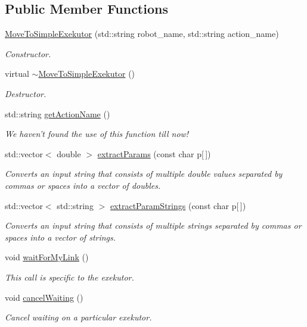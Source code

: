 \subsection*{\-Public \-Member \-Functions}
\begin{DoxyCompactItemize}
\item 
\hyperlink{classexekutor_1_1MoveToSimpleExekutor_ac5a9f74e210eccfb6ecf42e07c00165d}{\-Move\-To\-Simple\-Exekutor} (std\-::string robot\-\_\-name, std\-::string action\-\_\-name)
\begin{DoxyCompactList}\small\item\em \-Constructor. \end{DoxyCompactList}\item 
virtual \hyperlink{classexekutor_1_1MoveToSimpleExekutor_a12574720abc2e2ea378610b7a7876c61}{$\sim$\-Move\-To\-Simple\-Exekutor} ()
\begin{DoxyCompactList}\small\item\em \-Destructor. \end{DoxyCompactList}\item 
std\-::string \hyperlink{classexekutor_1_1ActionExekutor_a48d170d3931798f4019856fc0f070392}{get\-Action\-Name} ()
\begin{DoxyCompactList}\small\item\em \-We haven't found the use of this function till now! \end{DoxyCompactList}\item 
std\-::vector$<$ double $>$ \hyperlink{classexekutor_1_1ActionExekutor_a4b392ae5a75627136a0c69832628ff28}{extract\-Params} (const char p\mbox{[}$\,$\mbox{]})
\begin{DoxyCompactList}\small\item\em \-Converts an input string that consists of multiple double values separated by commas or spaces into a vector of doubles. \end{DoxyCompactList}\item 
std\-::vector$<$ std\-::string $>$ \hyperlink{classexekutor_1_1ActionExekutor_a0ba18a7fb0cfcd2043fab49e6807aec7}{extract\-Param\-Strings} (const char p\mbox{[}$\,$\mbox{]})
\begin{DoxyCompactList}\small\item\em \-Converts an input string that consists of multiple strings separated by commas or spaces into a vector of strings. \end{DoxyCompactList}\item 
void \hyperlink{classexekutor_1_1ActionExekutor_a842baca8b8c8481088a3024c2304ae92}{wait\-For\-My\-Link} ()
\begin{DoxyCompactList}\small\item\em \-This call is specific to the exekutor. \end{DoxyCompactList}\item 
void \hyperlink{classexekutor_1_1ActionExekutor_a2bf07fe6ee0038ce8d6209310c41a094}{cancel\-Waiting} ()
\begin{DoxyCompactList}\small\item\em \-Cancel waiting on a particular exekutor. \end{DoxyCompactList}\end{DoxyCompactItemize}
